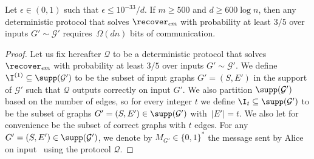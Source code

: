 \begin{lemma} \label{lem:lb-recover}
	Let $\epsilon \in (0,1)$ such that $\epsilon \le {10^{-33}}/{d}$. If $m\ge 500$ and $d \ge 600 \log n$, then any deterministic protocol that solves $\recover_{\epsilon m}$ with probability at least $3/5$ over inputs $G' \sim \mathcal{G}'$ requires~$\Omega(dn)$ bits of communication.
\end{lemma}
\begin{proof}
	Let us fix hereafter $\mathcal{Q}$ to be a deterministic protocol that solves $\recover_{\epsilon m}$ with probability at least $3/5$ over inputs $G' \sim \mathcal{G}'$. We define $\I^{(1)} \subseteq \supp(\mathcal{G}')$  to be the subset of input graphs $G'=(S,E')$ in the support of $\mathcal{G}'$ such that $\mathcal{Q}$ outputs correctly on input $G'$. We also partition $\supp(\mathcal{G}')$ based on the number of edges, so for every integer $t$ we define $\I_t  \subseteq \supp(\mathcal{G}')$ to be the subset of graphs $G'=(S,E') \in \supp(\mathcal{G}')$ with~$|E'| = t$. We also let for convenience  be the subset of correct graphs with $t$ edges. For any $G'=(S,E') \in \supp(\mathcal{G}')$, we denote by $M_{G'} \in \{0,1\}^*$ the message sent by Alice on input~ using the protocol $\mathcal{Q}$.
		

\end{proof}
